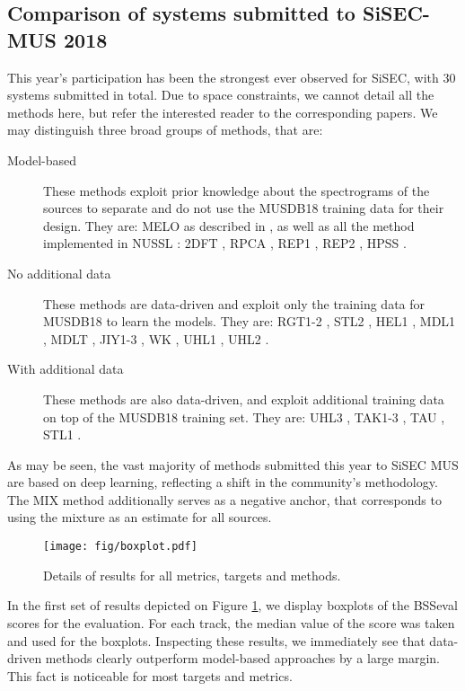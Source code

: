 \documentclass{article}
\begin{document}
\subsection{Comparison of systems submitted to SiSEC-MUS 2018}
This year's participation has been the strongest ever observed for SiSEC, with $30$ systems submitted in total. Due to space constraints, we cannot detail all the methods here, but refer the interested reader to the corresponding papers. We may distinguish three broad groups of methods, that are:
\begin{description}
  \item[Model-based] These methods exploit prior knowledge about the spectrograms of the sources to separate and do not use the MUSDB18 training data for their design. They are: MELO as described in \cite{MELO}, as well as all the method implemented in NUSSL \cite{NUSSL}: 2DFT \cite{2DFT}, RPCA \cite{RPCA}, REP1 \cite{REP1}, REP2 \cite{REP2}, HPSS \cite{HPSS}.
  \item[No additional data] These methods are data-driven and exploit only the
  training data for MUSDB18 to learn the models. They are: RGT1-2 \cite{RGT1}, STL2 \cite{stoller2018a}, HEL1 \cite{HEL1}, MDL1 \cite{MDL1}, MDLT \cite{MDLT}, JIY1-3 \cite{JY1}, WK \cite{WK}, UHL1 \cite{UHL1}, UHL2 \cite{UHL2}.
  \item[With additional data] These methods are also data-driven, and exploit additional training data on top of the MUSDB18 training set. They are: UHL3 \cite{UHL2}, TAK1-3 \cite{TAK1}, TAU \cite{TAK1,UHL2}, STL1 \cite{stoller2018a}.
\end{description}

As may be seen, the vast majority of methods submitted this year to SiSEC MUS are based on deep learning, reflecting a shift in the community's methodology. The MIX method additionally serves as a negative anchor, that corresponds to using the mixture as an estimate for all sources.
\begin{figure}
  \begin{center}
     \texttt{[image: fig/boxplot.pdf]}
  \end{center}
  \caption{Details of results for all metrics, targets and methods.}
  \label{fig:boxplots_bsseval}
\end{figure}

In the first set of results depicted on Figure \ref{fig:boxplots_bsseval}, we display boxplots of the BSSeval scores for the evaluation. For each track, the median value of the score was taken and used for the boxplots. Inspecting these results, we immediately see that data-driven methods clearly outperform model-based approaches by a large margin. This fact is noticeable for most targets and metrics.
\end{document}
